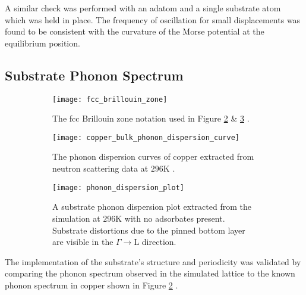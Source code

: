 A similar check was performed with an adatom and a single substrate atom which was held in place. The frequency of oscillation for small displacements was found to be consistent with the curvature of the Morse potential at the equilibrium position.

\subsection{Substrate Phonon Spectrum} \label{sec:phonon_spectrum}

\begin{figure}
	\centering
	\begin{subfigure}[t]{0.32\textwidth}
		\texttt{[image: fcc\_brillouin\_zone]}
		\caption{The fcc Brillouin zone notation used in Figure \ref{fig:experimential_phonon_dispersion_plot} \& \ref{fig:phonon_dispersion_plot} \cite{Zaleski}.}
		\label{fig:fcc_notation}
	\end{subfigure}
	\hfill
	\begin{subfigure}[t]{0.63\textwidth}
		\texttt{[image: copper\_bulk\_phonon\_dispersion\_curve]}
		\caption{The phonon dispersion curves of copper extracted from neutron scattering data at $296\si{\kelvin}$ \cite{Svensson}.}
		\label{fig:experimential_phonon_dispersion_plot}
	\end{subfigure}
	\begin{subfigure}[t]{1.0\textwidth}
		\texttt{[image: phonon\_dispersion\_plot]}
		\caption{A substrate phonon dispersion plot extracted from the simulation at $296\si{\kelvin}$ with no adsorbates present. Substrate distortions due to the pinned bottom layer are visible in the $\Gamma\rightarrow \mathrm{L}$ direction.}
		\label{fig:phonon_dispersion_plot}
	\end{subfigure}
	\caption{}
	\label{fig:phonons}
\end{figure}

The implementation of the substrate's structure and periodicity was validated by comparing the phonon spectrum observed in the simulated lattice to the known phonon spectrum in copper shown in Figure \ref{fig:experimential_phonon_dispersion_plot} \cite{sinha}. 

